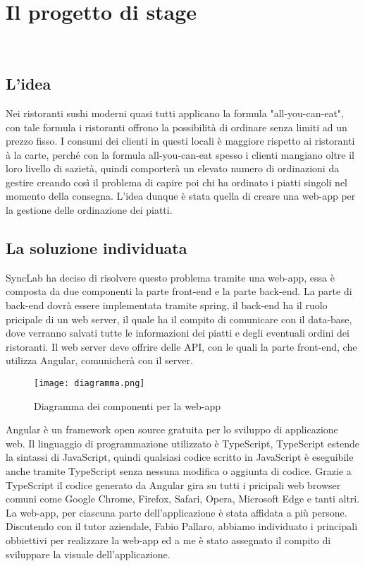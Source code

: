 
\chapter{Il progetto di stage}
\label{cap:il progetto di stage}

\\

\section{L'idea}

Nei ristoranti sushi moderni quasi tutti applicano la formula "all-you-can-eat", con tale formula i ristoranti offrono la possibilità di ordinare senza limiti ad un prezzo fisso. I consumi dei clienti in questi locali è maggiore rispetto ai ristoranti à la carte, perché con la formula all-you-can-eat spesso i clienti mangiano oltre il loro livello di sazietà, quindi comporterà un elevato numero di ordinazioni da gestire creando così il problema di capire poi chi ha ordinato i piatti singoli nel momento della consegna. L'idea dunque è stata quella di creare una web-app per la gestione delle ordinazione dei piatti.

\section{La soluzione individuata}
SyncLab ha deciso di risolvere questo problema tramite una web-app, essa è composta da due componenti la parte front-end e la parte back-end. La parte di back-end dovrà essere implementata tramite spring, il back-end ha il ruolo pricipale di un web server, il quale ha il compito di comunicare con il data-base, dove verranno salvati tutte le informazioni dei piatti e degli eventuali ordini dei ristoranti. Il web server deve offrire delle API, con le quali la parte front-end, che utilizza Angular, comunicherà con il server. 
\begin{figure}[H]
    \centering
    \texttt{[image: diagramma.png]}
    \caption{Diagramma dei componenti per la web-app}
\end{figure}
Angular è un framework open source gratuita per lo sviluppo di applicazione web. Il linguaggio di programmazione utilizzato è TypeScript, TypeScript estende la sintassi di JavaScript, quindi qualsiasi codice scritto in JavaScript è eseguibile anche tramite TypeScript senza nessuna modifica o aggiunta di codice. Grazie a TypeScript il codice generato da Angular gira su tutti i pricipali web browser comuni come Google Chrome, Firefox, Safari, Opera, Microsoft Edge e tanti altri. La web-app, per ciascuna parte dell'applicazione è stata affidata a più persone. Discutendo con il tutor aziendale, Fabio Pallaro, abbiamo individuato i principali obbiettivi per realizzare la web-app ed a me è stato assegnato il compito di sviluppare la visuale dell'applicazione. 

